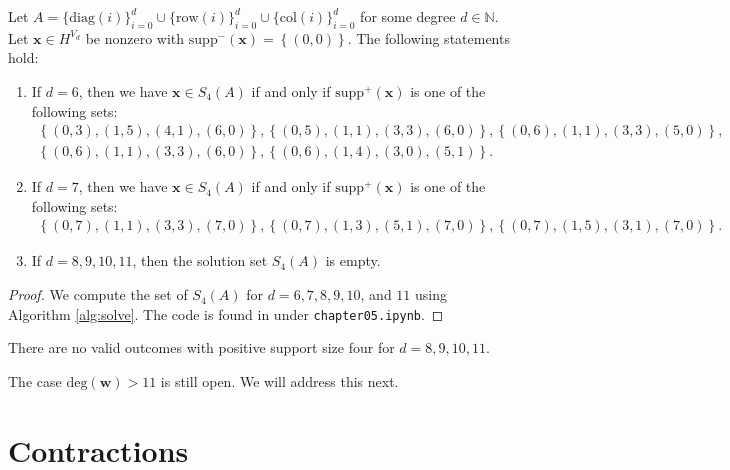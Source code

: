 \begin{proposition}\label{prop:jdngkjrenj3nw}
    Let $A = \{ \mathrm{diag}(i) \}_{i=0}^d \cup \{ \mathrm{row}(i)\}^d_{i=0} \cup \{ \mathrm{col}(i) \}^d_{i=0}$ for some degree \( d \in \mathbb{N} \). Let \( \mathbf{x} \in H^{V_d} \) be nonzero with \( \mathrm{supp}^-(\mathbf{x}) = \left\{ (0,0) \right\} \). The following statements hold:

    \begin{enumerate}
        \item If \( d = 6 \), then we have \( \mathbf{x} \in S_4(A) \) if and only if \( \mathrm{supp}^+(\mathbf{x}) \) is one of the following sets:
        \begin{gather*}
            \left\{ (0,3), (1,5), (4,1), (6,0) \right\},
            \left\{ (0,5), (1,1), (3,3), (6,0) \right\},
            \left\{ (0,6), (1,1), (3,3), (5,0) \right\},\\
            \left\{ (0,6), (1,1), (3,3), (6,0) \right\},
            \left\{ (0,6), (1,4), (3,0), (5,1) \right\}.
        \end{gather*}
        \item If \( d = 7 \), then we have \( \mathbf{x} \in S_4(A) \) if and only if \( \mathrm{supp}^+(\mathbf{x}) \) is one of the following sets:
        \begin{gather*}
            \left\{ (0,7), (1,1), (3,3), (7,0) \right\},
            \left\{ (0,7), (1,3), (5,1), (7,0) \right\},
            \left\{ (0,7), (1,5), (3,1), (7,0) \right\}.
        \end{gather*}
        \item If \( d = 8, 9 ,10, 11 \), then the solution set \( S_4(A) \) is empty.
    \end{enumerate}
\end{proposition}

\begin{proof}
    We compute the set of \( S_4(A) \) for \( d = 6,7,8,9,10 \), and \( 11 \) using Algorithm \ref{alg:solve}. The code is found in \cite{ducrepo} under \texttt{chapter05.ipynb}.
\end{proof}

\begin{corollary}
    There are no valid outcomes with positive support size four for \( d = 8, 9, 10, 11 \).
\end{corollary}

The case \( \mathrm{deg}(\mathbf{w}) > 11 \) is still open. We will address this next.

\section{Contractions}

